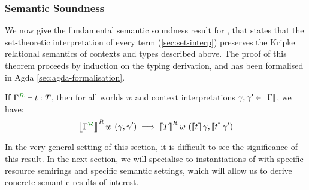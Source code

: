 \subsubsection{Semantic Soundness}

We now give the fundamental semantic soundness result for \name{},
that states that the set-theoretic interpretation of every term
(\autoref{sec:set-interp}) preserves the Kripke relational semantics
of contexts and types described above. The proof of this theorem
proceeds by induction on the typing derivation, and has been
formalised in Agda \autoref{sec:agda-formalisation}.

\begin{theorem}
  If $\ctx{\Gamma}{R} \vdash t : T$, then for all worlds $w$ and
  context interpretations $\gamma, \gamma' \in \left\llbracket \Gamma \right\rrbracket$, we have:
  \begin{displaymath}
    \sem{\ctx{\Gamma}{R}}^R w~(\gamma, \gamma') \implies \sem{T}^R w~(\sem{t}\gamma, \sem{t}\gamma')
  \end{displaymath}
\end{theorem}

In the very general setting of this section, it is difficult to see
the significance of this result. In the next section, we will
specialise to instantiations of \name{} with specific resource
semirings and specific semantic settings, which will allow us to
derive concrete semantic results of interest.


